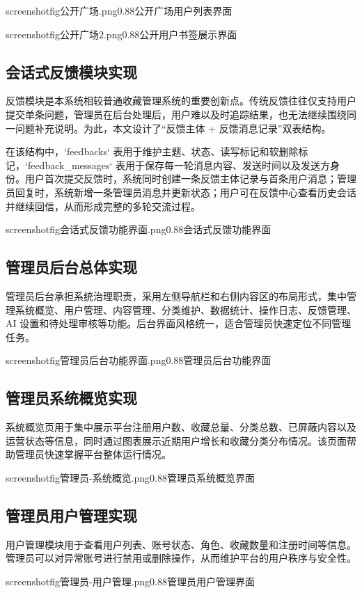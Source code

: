\documentclass[12pt,a4paper]{ctexart}
\begin{document}
screenshotfig{公开广场.png}{0.88}{公开广场用户列表界面}

screenshotfig{公开广场2.png}{0.88}{公开用户书签展示界面}

\subsection{会话式反馈模块实现}
反馈模块是本系统相较普通收藏管理系统的重要创新点。传统反馈往往仅支持用户提交单条问题，管理员在后台处理后，用户难以及时追踪结果，也无法继续围绕同一问题补充说明。为此，本文设计了“反馈主体 + 反馈消息记录”双表结构。

在该结构中，`feedbacks` 表用于维护主题、状态、读写标记和软删除标记，`feedback_messages` 表用于保存每一轮消息内容、发送时间以及发送方身份。用户首次提交反馈时，系统同时创建一条反馈主体记录与首条用户消息；管理员回复时，系统新增一条管理员消息并更新状态；用户可在反馈中心查看历史会话并继续回信，从而形成完整的多轮交流过程。

screenshotfig{会话式反馈功能界面.png}{0.88}{会话式反馈功能界面}

\subsection{管理员后台总体实现}
管理员后台承担系统治理职责，采用左侧导航栏和右侧内容区的布局形式，集中管理系统概览、用户管理、内容管理、分类维护、数据统计、操作日志、反馈管理、AI 设置和待处理审核等功能。后台界面风格统一，适合管理员快速定位不同管理任务。

screenshotfig{管理员后台功能界面.png}{0.88}{管理员后台功能界面}

\subsection{管理员系统概览实现}
系统概览页用于集中展示平台注册用户数、收藏总量、分类总数、已屏蔽内容以及运营状态等信息，同时通过图表展示近期用户增长和收藏分类分布情况。该页面帮助管理员快速掌握平台整体运行情况。

screenshotfig{管理员-系统概览.png}{0.88}{管理员系统概览界面}

\subsection{管理员用户管理实现}
用户管理模块用于查看用户列表、账号状态、角色、收藏数量和注册时间等信息。管理员可以对异常账号进行禁用或删除操作，从而维护平台的用户秩序与安全性。

screenshotfig{管理员-用户管理.png}{0.88}{管理员用户管理界面}
\end{document}
